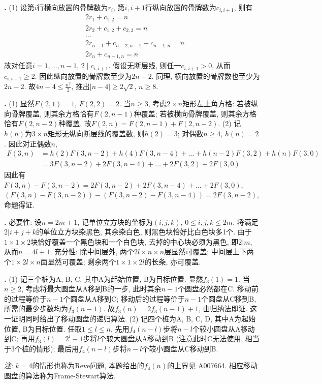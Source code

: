 \par \textbf{\thesolrec .} (1) \cite{IC} 设第$i$行横向放置的骨牌数为$r_i$, 第$i,i+1$行纵向放置的骨牌数为$c_{i,i+1}$, 则有
\begin{align*}
    &2r_1 + c_{1,2}=n\\
    &2r_2 + c_{1,2} + c_{2,3}=n\\
    &\dots\\
    &2r_{n-1} + c_{n-2,n-1} + c_{n-1,n} = n\\
    & 2r_n + c_{n-1,n} = n
\end{align*}
故对任意$i=1,\dots, n-1$, $2\mid c_{i,i+1}$. 假设无断层线, 则任一$c_{i,i+1}>0$, 从而$c_{i,i+1}\ge 2$. 因此纵向放置的骨牌数至少为$2n-2$. 同理, 横向放置的骨牌数也至少为$2n-2$. 故$4n-4\le  \frac{n^2}{2}$, 推出$ | n-4 | \ge 2\sqrt{2}$, $n\ge 8$. 

\par \textbf{\thesolrec .} (1) \cite{IC} 显然$F(2,1)=1$, $F(2,2)=2$. 当$n\ge 3$, 考虑$2\times n$矩形左上角方格: 若被纵向骨牌覆盖, 则其余方格恰有$F(2,n-1)$种覆盖; 若被横向骨牌覆盖, 则其余方格恰有$F(2,n-2)$种覆盖. 故$F(2,n)=F(2,n-1)+F(2,n-2)$. (2) 记$h(n)$为$3\times n$矩形无纵向断层线的覆盖数, 则$h(2)=3$; 对偶数$n\ge 4$, $h(n)=2$. 因此对正偶数$n$, 
\begin{align*}
    F(3,n)&=h(2)F(3,n-2)+h(4)F(3,n-4)+\dots+h(n-2)F(3,2)+h(n)F(3,0)\\
    &=3F(3,n-2)+2F(3,n-4)+\dots+2F(3,2)+2F(3,0)
\end{align*}
因此有$F(3,n)-F(3,n-2)=2F(3,n-2)+2F(3,n-4)+\dots+2F(3,0)$, $(F(3,n)-F(3,n-2))-(F(3,n-2)-F(3,n-4))=2F(3,n-2)$, 命题得证. 

\par \textbf{\thesolrec .} 必要性: 设$n=2m+1$, 记单位立方块的坐标为$(i,j,k)$, $0\le i,j,k\le 2m$. 将满足$2|i+j+k$的单位立方块染黑色, 其余染白色, 则黑色块恰好比白色块多1个. 由于$1\times 1\times 2$块恰好覆盖一个黑色块和一个白色块, 去掉的中心块必须为黑色, 即$2|m$, 从而$n=4l+1$. 充分性: 除中间层外, 两个$2l\times n \times n$层显然可覆盖; 中间层上下两个$1\times 2l \times n$面显然可覆盖; 剩余两个$1\times 1\times 2l$的长条, 亦可覆盖. 

\par \textbf{\thesolrec .} (1) 记三个桩为A, B, C, 其中A为起始位置, B为目标位置. 显然$f_3(1)=1$. 当$n\ge 2$, 考虑将最大圆盘从A移到B的一步, 此时其余$n-1$个圆盘必然都在C. 移动前的过程等价于$n-1$个圆盘从A移到C; 移动后的过程等价于$n-1$个圆盘从C移到B, 所需的最少步数均为$f_3(n-1)$. 故$f_3(n)=2f_3(n-1)+1$, 由归纳法即证. 这一证明同时给出了移动圆盘的递归算法. (2) 记四个桩为A, B, C, D, 其中A为起始位置, B为目标位置. 任取$1\le l\le n$, 先用$f_4(n-l)$步将$n-l$个较小圆盘从A移动到C; 再用$f_3(l)=2^l-1$步将$l$个较大圆盘从A移动到B (注意此时C无法使用, 相当于3个桩的情形); 最后用$f_4(n-l)$步将$n-l$个较小圆盘从C移动到B. 
\par \emph{注}: $k=4$的情形也称为Reve问题, 本题给出的$f_4(n)$的上界见\cite{OEIS} A007664. 相应移动圆盘的算法称为Frame-Stewart算法. 
